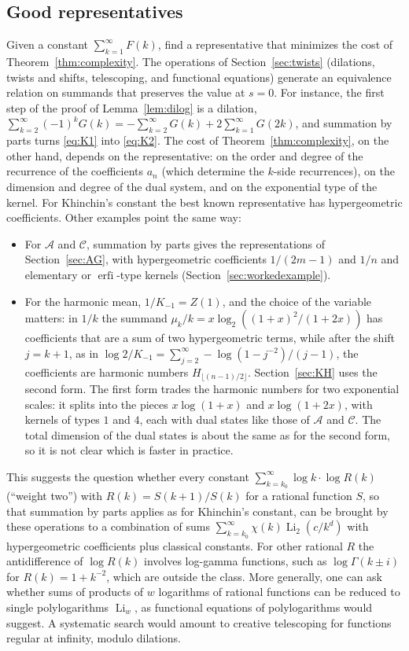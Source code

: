\documentclass[11pt,reqno]{amsart}
\theoremstyle{definition}
\theoremstyle{remark}
\newcommand{\Li}{\operatorname{Li}}
\begin{document}
\subsection{Good representatives}\label{sec:generalize}
Given a constant $\sum_{k=1}^{\infty}F(k)$, find a representative that minimizes the cost of
Theorem~\ref{thm:complexity}. The operations of Section~\ref{sec:twists} (dilations, twists and shifts, telescoping,
and functional equations) generate an equivalence relation on summands that preserves the value at $s = 0$. For
instance, the first step of the proof of Lemma~\ref{lem:dilog} is a dilation,
$\sum_{k=2}^{\infty}(-1)^kG(k) = -\sum_{k=2}^{\infty}G(k) + 2\sum_{k=1}^{\infty}G(2k)$, and summation by parts turns
\eqref{eq:K1} into \eqref{eq:K2}.
The cost of Theorem~\ref{thm:complexity}, on the other hand, depends on the representative: on the order and degree of
the recurrence of the coefficients $a_n$ (which determine the $k$-side recurrences), on the dimension and degree of
the dual system, and on the exponential type of the kernel. For Khinchin's constant the best known representative has
hypergeometric coefficients. Other examples point the same way:
\begin{itemize}
\item For $\mathcal A$ and $\mathcal C$, summation by parts gives the representations of Section~\ref{sec:AG}, with
hypergeometric coefficients $1/(2m-1)$ and $1/n$ and elementary or $\operatorname{erfi}$-type kernels
(Section~\ref{sec:workedexample}).
\item For the harmonic mean, $1/K_{-1} = Z(1)$, and the choice of the variable matters: in $1/k$ the summand
$\mu_k/k = x\log_2((1+x)^2/(1+2x))$ has coefficients that are a sum of two hypergeometric terms, while after the shift
$j = k+1$, as in $\log 2/K_{-1} = \sum_{j=2}^{\infty}-\log(1-j^{-2})/(j-1)$, the coefficients are harmonic numbers
$H_{\lfloor (n-1)/2\rfloor}$. Section~\ref{sec:KH} uses the second form. The first form trades the harmonic
numbers for two exponential scales: it splits into the pieces $x\log(1+x)$ and $x\log(1+2x)$, with kernels of
types $1$ and $4$, each with dual states like those of $\mathcal A$ and $\mathcal C$. The total dimension of the dual
states is about the same as for the second form, so it is not clear which is faster in practice.
\end{itemize}
This suggests the question whether every constant $\sum_{k=k_0}^{\infty}\log k\cdot\log R(k)$ (``weight two'') with
$R(k) = S(k+1)/S(k)$ for a rational function $S$, so that summation by parts applies as for Khinchin's constant, can be
brought by these operations to a combination of sums $\sum_{k=k_0}^{\infty}\chi(k)\Li_2(c/k^d)$ with hypergeometric
coefficients plus classical constants. For other rational $R$ the antidifference of $\log R(k)$ involves log-gamma
functions, such as $\log\Gamma(k \pm i)$ for $R(k) = 1 + k^{-2}$, which are outside the class. More generally, one can
ask whether sums of products of $w$ logarithms of rational functions can be
reduced to single polylogarithms $\Li_w$, as functional equations of polylogarithms would suggest. A systematic
search would amount to creative telescoping for functions regular at infinity, modulo dilations.
\end{document}
